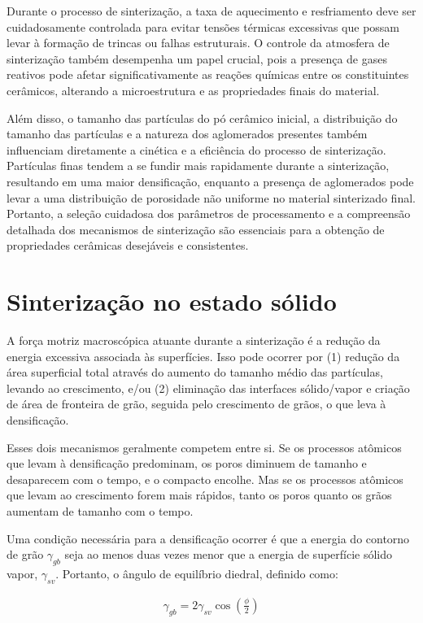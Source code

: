 Durante o processo de sinterização, a taxa de aquecimento e resfriamento deve ser cuidadosamente controlada para evitar tensões térmicas excessivas que possam levar à formação de trincas ou falhas estruturais. O controle da atmosfera de sinterização também desempenha um papel crucial, pois a presença de gases reativos pode afetar significativamente as reações químicas entre os constituintes cerâmicos, alterando a microestrutura e as propriedades finais do material.

Além disso, o tamanho das partículas do pó cerâmico inicial, a distribuição do tamanho das partículas e a natureza dos aglomerados presentes também influenciam diretamente a cinética e a eficiência do processo de sinterização. Partículas finas tendem a se fundir mais rapidamente durante a sinterização, resultando em uma maior densificação, enquanto a presença de aglomerados pode levar a uma distribuição de porosidade não uniforme no material sinterizado final. Portanto, a seleção cuidadosa dos parâmetros de processamento e a compreensão detalhada dos mecanismos de sinterização são essenciais para a obtenção de propriedades cerâmicas desejáveis e consistentes.

\section*{Sinterização no estado sólido}

A força motriz macroscópica atuante durante a sinterização é a redução da energia excessiva associada às superfícies. Isso pode ocorrer por (1) redução da área superficial total através do aumento do tamanho médio das partículas, levando ao crescimento, e/ou (2) eliminação das interfaces sólido/vapor e criação de área de fronteira de grão, seguida pelo crescimento de grãos, o que leva à densificação.

Esses dois mecanismos geralmente competem entre si. Se os processos atômicos que levam à densificação predominam, os poros diminuem de tamanho e desaparecem com o tempo, e o compacto encolhe. Mas se os processos atômicos que levam ao crescimento forem mais rápidos, tanto os poros quanto os grãos aumentam de tamanho com o tempo.

Uma condição necessária para a densificação ocorrer é que a energia do contorno de grão $\gamma_{gb}$ seja ao menos duas vezes menor que a energia de superfície sólido vapor, $\gamma_{sv}$. Portanto, o ângulo de equilíbrio diedral, definido como:

\begin{gather}
    \gamma_{gb} = 2 \gamma_{sv} \cos(\frac{\phi}{2})
\end{gather}

